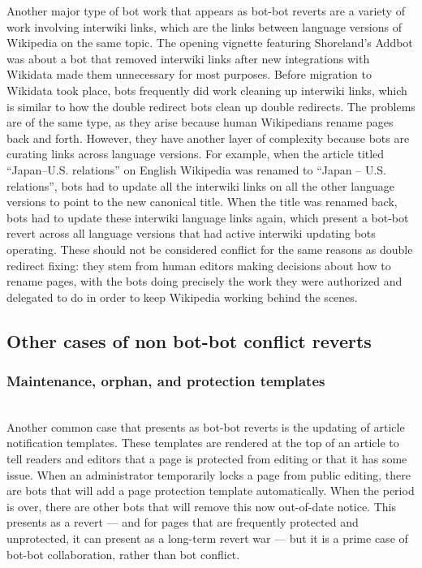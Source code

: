 \documentclass[format=acmsmall, review=false, screen=true]{acmart}%
\begin{document}
Another major type of bot work that appears as bot-bot reverts are a variety of work involving interwiki links, which are the links between language versions of Wikipedia on the same topic. The opening vignette featuring Shoreland's Addbot was about a bot that removed interwiki links after new integrations with Wikidata made them unnecessary for most purposes. Before migration to Wikidata took place, bots frequently did work cleaning up interwiki links, which is similar to how the double redirect bots clean up double redirects. The problems are of the same type, as they arise because human Wikipedians rename pages back and forth. However, they have another layer of complexity because bots are curating links across language versions. For example, when the article titled ``Japan--U.S. relations'' on English Wikipedia was renamed to ``Japan -- U.S. relations'', bots had to update all the interwiki links on all the other language versions to point to the new canonical title. When the title was renamed back, bots had to update these interwiki language links again, which present a bot-bot revert across all language versions that had active interwiki updating bots operating. These should not be considered conflict for the same reasons as double redirect fixing: they stem from human editors making decisions about how to rename pages, with the bots doing precisely the work they were authorized and delegated to do in order to keep Wikipedia working behind the scenes.

\subsection{Other cases of non bot-bot conflict reverts}  
\subsubsection{Maintenance, orphan, and protection templates}  
~\\
Another common case that presents as bot-bot reverts is the updating of article notification templates. These templates are rendered at the top of an article to tell readers and editors that a page is protected from editing or that it has some issue. When an administrator temporarily locks a page from public editing, there are bots that will add a page protection template automatically. When the period is over, there are other bots that will remove this now out-of-date notice. This presents as a revert --- and for pages that are frequently protected and unprotected, it can present as a long-term revert war --- but it is a prime case of bot-bot collaboration, rather than bot conflict.   
\end{document}
